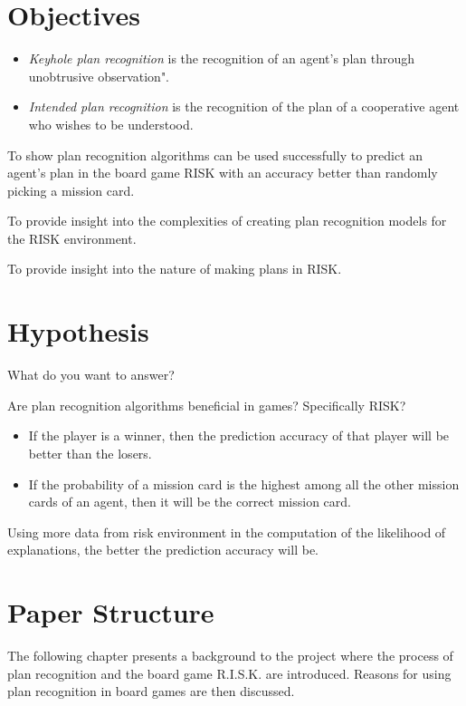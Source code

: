 \documentclass[parskip]{cs4rep}
\begin{document}
\section{Objectives}

\begin{itemize}
\item
\textit{Keyhole plan recognition} is the recognition of an agent's plan through unobtrusive observation".
\item
\textit{Intended plan recognition} is the recognition of the plan of a cooperative agent who wishes to be understood.
\newline
\end{itemize}

To show plan recognition algorithms can be used successfully to predict an agent's plan in the board game RISK with an accuracy better than randomly picking a mission card.

To provide insight into the complexities of creating plan recognition models for the RISK environment.

To provide insight into the nature of making plans in RISK. 

\section{Hypothesis}

What do you want to answer?

Are plan recognition algorithms beneficial in games? Specifically RISK?

\begin{itemize}
\item
If the player is a winner, then the prediction accuracy of that player will be better than the losers.
\item
If the probability of a mission card is the highest among all the other mission cards of an agent, then it will be the correct mission card.
\newline
\end{itemize}

Using more data from risk environment in the computation of the likelihood of explanations, the better the prediction accuracy will be.

\section{Paper Structure}

The following chapter presents a background to the project where the process of plan recognition and the board game R.I.S.K. are introduced. Reasons for using plan recognition in board games are then discussed.
\end{document}
